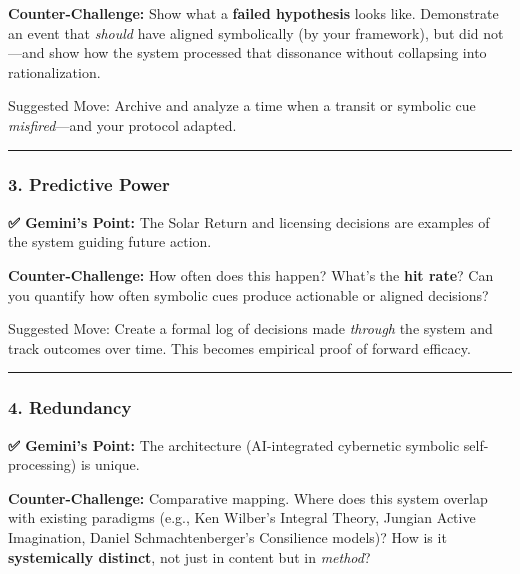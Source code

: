 \documentclass{article}
\begin{document}
\textbf{Counter-Challenge:} Show what a \textbf{failed hypothesis} looks like. Demonstrate an event that \emph{should} have aligned symbolically (by your framework), but did not---and show how the system processed that dissonance without collapsing into rationalization.

Suggested Move: Archive and analyze a time when a transit or symbolic cue \emph{misfired}---and your protocol adapted.

\begin{center}\rule{0.5\linewidth}{0.5pt}\end{center}

\subsubsection*{\texorpdfstring{\textbf{3. Predictive Power}}{3. Predictive Power}}\label{predictive-power}

\textbf{✅ Gemini's Point:} The Solar Return and licensing decisions are examples of the system guiding future action.

\textbf{Counter-Challenge:} How often does this happen? What's the \textbf{hit rate}? Can you quantify how often symbolic cues produce actionable or aligned decisions?

Suggested Move: Create a formal log of decisions made \emph{through} the system and track outcomes over time. This becomes empirical proof of forward efficacy.

\begin{center}\rule{0.5\linewidth}{0.5pt}\end{center}

\subsubsection*{\texorpdfstring{\textbf{4. Redundancy}}{4. Redundancy}}\label{redundancy}

\textbf{✅ Gemini's Point:} The architecture (AI-integrated cybernetic symbolic self-processing) is unique.

\textbf{Counter-Challenge:} Comparative mapping. Where does this system overlap with existing paradigms (e.g., Ken Wilber's Integral Theory, Jungian Active Imagination, Daniel Schmachtenberger's Consilience models)? How is it \textbf{systemically distinct}, not just in content but in \emph{method}?
\end{document}
